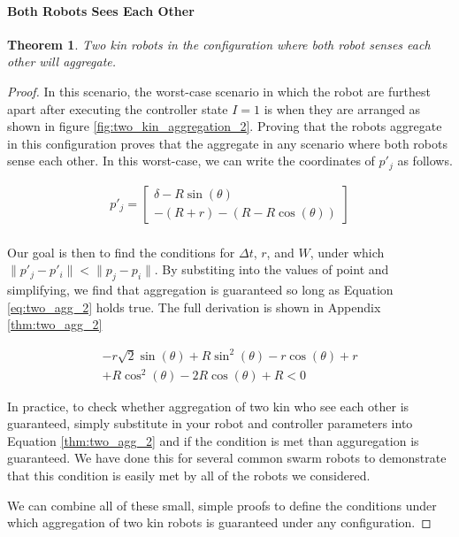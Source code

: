 \documentclass[conference]{IEEEtran}
\newtheorem{theorem}{Theorem}
\begin{document}
    \paragraph{Both Robots Sees Each Other}
    \begin{theorem}
      Two kin robots in the configuration where both robot senses each other will aggregate.
    \end{theorem}
    \begin{proof}
      In this scenario, the worst-case scenario in which the robot are furthest apart after executing the controller state $I=1$ is when they are arranged as shown in figure \ref{fig:two_kin_aggregation_2}. Proving that the robots aggregate in this configuration proves that the aggregate in any scenario where both robots sense each other. In this worst-case, we can write the coordinates of $p'_j$ as follows.

    \begin{equation} \label{eq:two_kin_vars_1}
      \begin{split}
        p'_j = \begin{bmatrix}\delta - R\sin(\theta) \\ -(R+r) - (R-R\cos(\theta))\end{bmatrix} \\
      \end{split}
    \end{equation}

      Our goal is then to find the conditions for $\Delta t$, $r$, and $W$, under which $\lVert p'_j - p'_i \rVert < \lVert p_j - p_i \rVert$. By substiting into the values of point and simplifying, we find that aggregation is guaranteed so long as Equation \eqref{eq:two_agg_2} holds true. The full derivation is shown in Appendix \ref{thm:two_agg_2}

      \begin{equation} \label{eq:two_agg_2}
        \begin{split}
        -r\sqrt{2}\sin(\theta) + R\sin^2(\theta) - r\cos(\theta) + r \\
          + R\cos^2(\theta) - 2R\cos(\theta) + R < 0
        \end{split}
      \end{equation}

      In practice, to check whether aggregation of two kin who see each other is guaranteed, simply substitute in your robot and controller parameters into Equation \eqref{thm:two_agg_2} and if the condition is met than agguregation is guaranteed. We have done this for several common swarm robots to demonstrate that this condition is easily met by all of the robots we considered.

      We can combine all of these small, simple proofs to define the conditions under which aggregation of two kin robots is guaranteed under any configuration.

    \end{proof}
\end{document}
